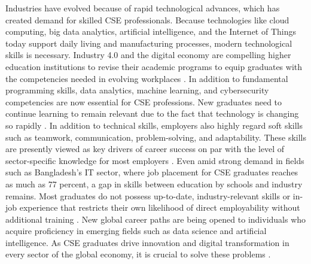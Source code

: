 \documentclass[final,5p,times,twocolumn]{elsarticle}
\begin{document}
Industries have evolved because of rapid technological advances, which has created demand for skilled CSE professionals. Because technologies like cloud computing, big data analytics, artificial intelligence, and the Internet of Things today support daily living and manufacturing processes, modern technological skills is necessary.  Industry 4.0 and the digital economy are compelling higher education institutions to revise their academic programs to equip graduates with the competencies needed in evolving workplaces \cite{1_MisraKhurana2017} . In addition to fundamental programming skills, data analytics, machine learning, and cybersecurity competencies are now essential for CSE professions. New graduates need to continue learning to remain relevant due to the fact that technology is changing so rapidly \cite{3_DeSilva2024} . In addition to technical skills, employers also highly regard soft skills such as teamwork, communication, problem-solving, and adaptability.
These skills are presently viewed as key drivers of career success on par with the level of sector-specific knowledge for most employers \cite{5_MohammedOzdamli2024} . Even amid strong demand in fields such as Bangladesh's IT sector, where job placement for CSE graduates reaches as much as 77 percent, a gap in skills between education by schools and industry remains. Most graduates do not possess up-to-date, industry-relevant skills or in-job experience that restricts their own likelihood of direct employability without additional training \cite{4_Chakraborty2019} . New global career paths are being opened to individuals who acquire proficiency in emerging fields such as data science and artificial intelligence. As CSE graduates drive innovation and digital transformation in every sector of the global economy, it is crucial to solve these problems \cite{6_PrinceIdrisKawserAlif2025} .
\end{document}
